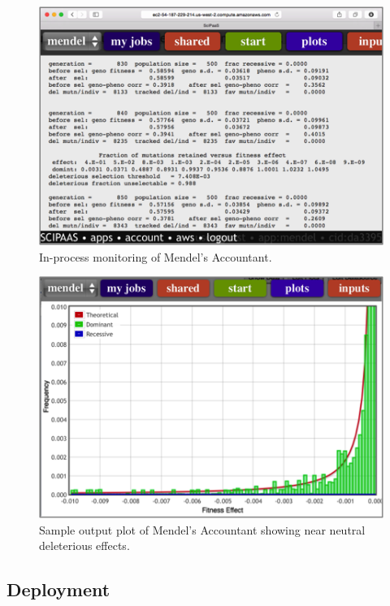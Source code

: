 \documentclass[10pt,reprint]{socc14}
\begin{document}
\begin{figure}[t]
\centering
\includegraphics[natwidth=454,natheight=315]{figs/output.png}
\caption{In-process monitoring of Mendel’s Accountant. \label{output}}
\end{figure}

\begin{figure}[t]
\centering
\includegraphics[natwidth=454,natheight=319]{figs/neutral.png}
\caption{Sample output plot of Mendel’s Accountant showing near neutral deleterious effects.\label{neutral}}
\end{figure}

\subsection{Deployment}
\end{document}
